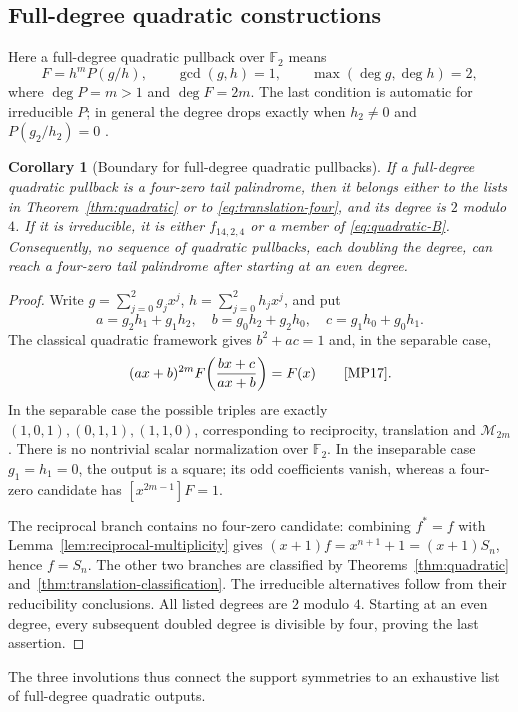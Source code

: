 \documentclass[11pt]{article}
\newtheorem{corollary}[proposition]{Corollary}
\theoremstyle{definition}
\theoremstyle{remark}
\begin{document}
\subsection{Full-degree quadratic constructions}\label{sec:quadratic-scope}
Here a full-degree quadratic pullback over $\mathbb F_2$ means
\[
 F=h^mP(g/h),\qquad \gcd(g,h)=1,\qquad
 \max(\deg g,\deg h)=2,
\]
where $\deg P=m>1$ and $\deg F=2m$.
The last condition is automatic for irreducible
$P$; in general the degree drops exactly when $h_2\ne0$ and
$P(g_2/h_2)=0$ \cite[Section 2]{MP17}.

\begin{corollary}[Boundary for full-degree quadratic pullbacks]
\label{cor:all-quadratic}
If a full-degree quadratic pullback is a four-zero tail palindrome,
then it belongs either to the lists in Theorem~\ref{thm:quadratic}
or to \eqref{eq:translation-four}, and its degree is $2$ modulo $4$.
If it is irreducible, it is either $f_{14,2,4}$ or a member of
\eqref{eq:quadratic-B}. Consequently, no sequence of quadratic
pullbacks, each doubling the degree, can reach a four-zero tail
palindrome after starting at an even degree.
\end{corollary}
\begin{proof}
Write $g=\sum_{j=0}^2g_jx^j$, $h=\sum_{j=0}^2h_jx^j$, and put
\[
 a=g_2h_1+g_1h_2,\quad b=g_0h_2+g_2h_0,\quad
 c=g_1h_0+g_0h_1.
\]
The classical quadratic framework gives $b^2+ac=1$ and, in the
separable case,
\[
 (ax+b)^{2m}F\!\left(\frac{bx+c}{ax+b}\right)=F(x)
 \qquad\text{\cite[Section 4, Lemma 9]{MP17}}.
\]
In the separable case the possible triples are exactly $(1,0,1),(0,1,1),(1,1,0)$,
corresponding to reciprocity, translation and $\mathcal M_{2m}$.
There is no nontrivial scalar normalization over $\mathbb F_2$.
In the inseparable case $g_1=h_1=0$, the output is a square;
its odd coefficients vanish, whereas a four-zero candidate has
$[x^{2m-1}]F=1$.

The reciprocal branch contains no four-zero candidate: combining
$f^*=f$ with Lemma~\ref{lem:reciprocal-multiplicity} gives
$(x+1)f=x^{n+1}+1=(x+1)S_n$, hence $f=S_n$.
The other two branches are classified by
Theorems~\ref{thm:quadratic} and~\ref{thm:translation-classification}.
The irreducible alternatives follow from their reducibility
conclusions. All listed degrees are $2$ modulo $4$.
Starting at an even degree, every subsequent doubled degree is
divisible by four, proving the last assertion.
\end{proof}

The three involutions thus connect the support symmetries to an
exhaustive list of full-degree quadratic outputs.
\end{document}
